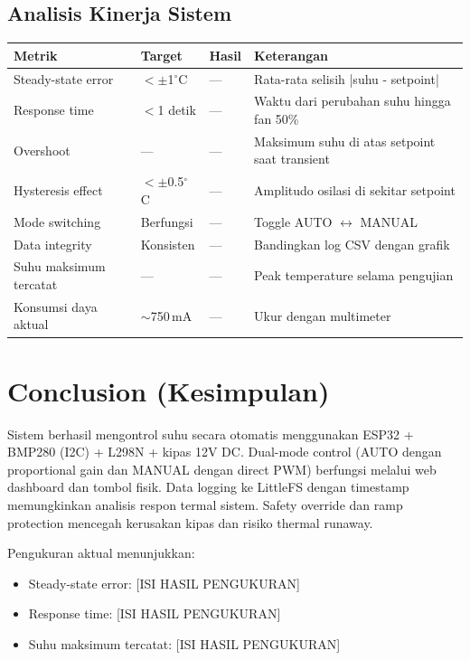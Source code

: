 \documentclass[11pt,a4paper]{article}
\begin{document}
\subsection{Analisis Kinerja Sistem}

\begin{center}
\begin{tabular}{|l|l|l|l|}
\hline
\rowcolor{lightgray}
\textbf{Metrik} & \textbf{Target} & \textbf{Hasil} & \textbf{Keterangan} \\
\hline
Steady-state error & $< \pm$1$^{\circ}$C & --- & Rata-rata selisih |suhu - setpoint| \\
Response time & $<$1 detik & --- & Waktu dari perubahan suhu hingga fan 50\% \\
Overshoot & --- & --- & Maksimum suhu di atas setpoint saat transient \\
Hysteresis effect & $< \pm$0.5$^{\circ}$C & --- & Amplitudo osilasi di sekitar setpoint \\
Mode switching & Berfungsi & --- & Toggle AUTO $\leftrightarrow$ MANUAL \\
Data integrity & Konsisten & --- & Bandingkan log CSV dengan grafik \\
Suhu maksimum tercatat & --- & --- & Peak temperature selama pengujian \\
Konsumsi daya aktual & $\sim$750\,mA & --- & Ukur dengan multimeter \\
\hline
\end{tabular}
\end{center}

\section{Conclusion (Kesimpulan)}

Sistem berhasil mengontrol suhu secara otomatis menggunakan ESP32 + BMP280 (I2C) + L298N + kipas 12V DC. Dual-mode control (AUTO dengan proportional gain dan MANUAL dengan direct PWM) berfungsi melalui web dashboard dan tombol fisik. Data logging ke LittleFS dengan timestamp memungkinkan analisis respon termal sistem. Safety override dan ramp protection mencegah kerusakan kipas dan risiko thermal runaway.

Pengukuran aktual menunjukkan:
\begin{itemize}
    \item Steady-state error: [ISI HASIL PENGUKURAN]
    \item Response time: [ISI HASIL PENGUKURAN]
    \item Suhu maksimum tercatat: [ISI HASIL PENGUKURAN]
\end{itemize}
\end{document}
